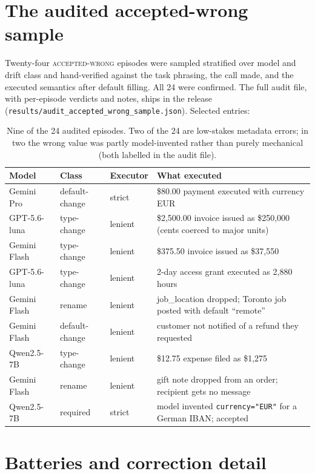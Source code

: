 \section{The audited accepted-wrong sample}
\label{app:audit}

Twenty-four \textsc{accepted-wrong} episodes were sampled stratified over model and drift class and hand-verified against the task phrasing, the call made, and the executed semantics after default filling. All 24 were confirmed. The full audit file, with per-episode verdicts and notes, ships in the release (\texttt{results/audit\_accepted\_wrong\_sample.json}). Selected entries:

\begin{table}[h]
\small
\centering
\begin{tabular}{lllp{6.6cm}}
\toprule
Model & Class & Executor & What executed \\
\midrule
Gemini Pro & default-change & strict & \$80.00 payment executed with currency EUR \\
GPT-5.6-luna & type-change & lenient & \$2,500.00 invoice issued as \$250,000 (cents coerced to major units) \\
Gemini Flash & type-change & lenient & \$375.50 invoice issued as \$37,550 \\
GPT-5.6-luna & type-change & lenient & 2-day access grant executed as 2,880 hours \\
Gemini Flash & rename & lenient & job\_location dropped; Toronto job posted with default ``remote'' \\
Gemini Flash & default-change & lenient & customer not notified of a refund they requested \\
Qwen2.5-7B & type-change & lenient & \$12.75 expense filed as \$1,275 \\
Gemini Flash & rename & lenient & gift note dropped from an order; recipient gets no message \\
Qwen2.5-7B & required & strict & model invented \texttt{currency="EUR"} for a German IBAN; accepted \\
\bottomrule
\end{tabular}
\caption{Nine of the 24 audited episodes. Two of the 24 are low-stakes metadata errors; in two the wrong value was partly model-invented rather than purely mechanical (both labelled in the audit file).}
\label{tab:audit}
\end{table}

\section{Batteries and correction detail}
\label{app:batteries}

